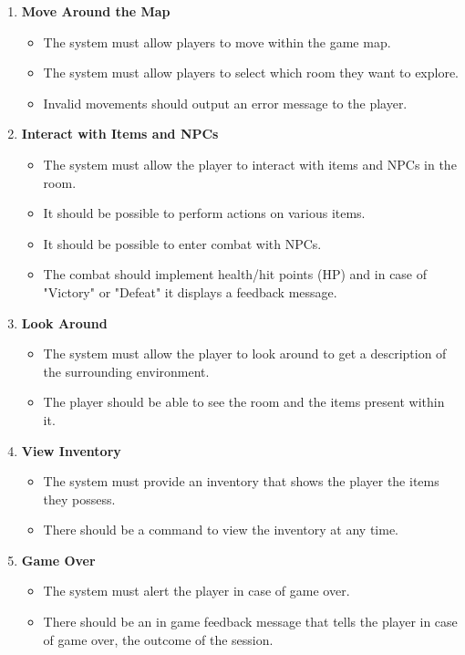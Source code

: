 \documentclass{article}
\begin{document}
\begin{enumerate}
    \item \textbf{Move Around the Map}
\begin{itemize}
    \item The system must allow players to move within the game map.
    \item The system must allow players to select which room they want to explore.
    \item Invalid movements should output an error message to the player.
\end{itemize}

    \item \textbf{Interact with Items and NPCs}
\begin{itemize}
    \item The system must allow the player to interact with items and NPCs in the room.
    \item It should be possible to perform actions on various items.
    \item It should be possible to enter combat with NPCs.
    \item The combat should implement health/hit points (HP) and in case of "Victory" or "Defeat" it displays a feedback message.
\end{itemize}

    \item \textbf{Look Around}
\begin{itemize}
    \item The system must allow the player to look around to get a description of the surrounding environment.
    \item The player should be able to see the room and the items present within it.
\end{itemize}

    \item \textbf{View Inventory}
\begin{itemize}
    \item The system must provide an inventory that shows the player the items they possess.
    \item There should be a command to view the inventory at any time.
\end{itemize}

\item \textbf{Game Over}
\begin{itemize}
    \item The system must alert the player in case of game over.
    \item There should be an in game feedback message that tells the player in case of game over, the outcome of the session.
\end{itemize}

 \end{enumerate}
\end{document}
